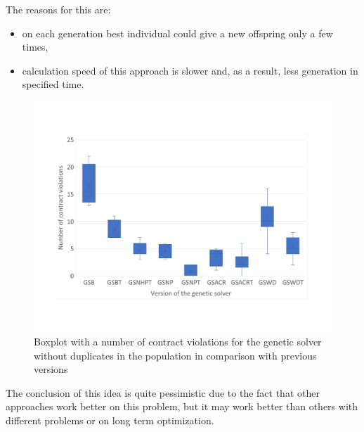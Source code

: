 The reasons for this are:
\begin{itemize}
	\item on each generation best individual could give a new offspring only a few times, 
	\item calculation speed of this approach is slower and, as a result, less generation in specified time.
\end{itemize}


\begin{figure}
	\centering
	\includegraphics[width=\textwidth]{images/BoxPlotSolverNoDuplicates.pdf}
	\caption[Boxplot with a number of contract violations for the genetic solver without duplicates in the population in comparison with previous versions]{Boxplot with a number of contract violations for the genetic solver without duplicates in the population in comparison with previous versions}
	\label{fig:boxplotsolverNoDuplicates}
\end{figure} 

The conclusion of this idea is quite pessimistic due to the fact that other approaches work better on this problem, but it may work better than others with different problems or on long term optimization.


